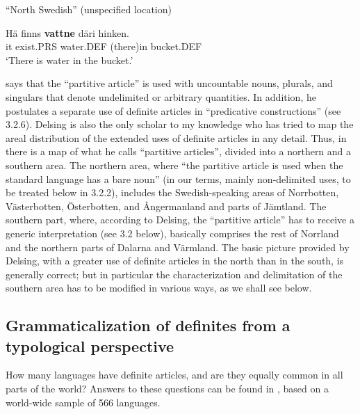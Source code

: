 \item 

“North Swedish” (unspecified location)



 \ea\label{}
\gll Hä  finns  \textbf{vattne} däri  hinken.\\


it  exist.PRS  water.DEF  (there)in  bucket.DEF\\

\glt ‘There is water in the bucket.’

\z

\citet[15]{Delsing2003a} says that the “partitive article” is used with uncountable nouns, plurals, and singulars that denote undelimited or arbitrary quantities. In addition, he postulates a separate use of definite articles in “predicative constructions” (see 3.2.6). Delsing is also the only scholar to my knowledge who has tried to map the areal distribution of the extended uses of definite articles in any detail. Thus, in \citet[18]{Delsing2003a} there is a map of what he calls “partitive articles”, divided into a northern and a southern area. The northern area, where “the partitive article is used when the standard language has a bare noun” (in our terms, mainly non-delimited uses, to be treated below in 3.2.2), includes the Swedish-speaking areas of Norrbotten, Västerbotten, Österbotten, and Ångermanland and parts of Jämtland. The southern part, where, according to Delsing, the “partitive article” has to receive a generic interpretation (see 3.2 below), basically comprises the rest of Norrland and the northern parts of Dalarna and Värmland. The basic picture provided by Delsing, with a greater use of definite articles in the north than in the south, is generally correct; but in particular the characterization and delimitation of the southern area has to be modified in various ways, as we shall see below. 


\subsection{\rmfamily Grammaticalization of definites from a typological perspective}
\label{bkm:Ref218335964}\label{bkm:Ref218335969}
How many languages have  definite articles, and are they equally common in all parts of the world? Answers to these questions can be found in \citet{Dryer2005}, based on a world-wide sample of 566 languages. 

